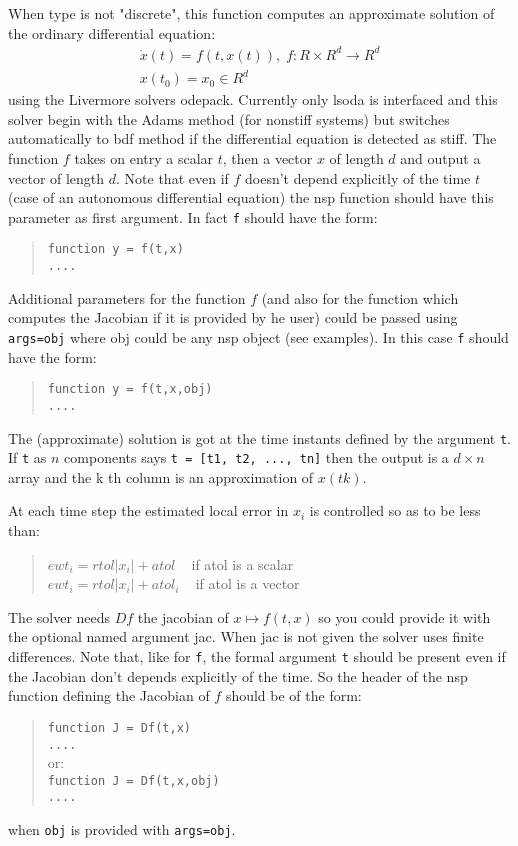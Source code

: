 \begin{mandescription}

When type is not "discrete", this function computes an approximate solution of the ordinary differential equation:
$$
\begin{array}{l}
   \dot{x}(t) = f(t, x(t)), \; f: R \times R^d \rightarrow  R^d \\
   x(t_0) = x_0  \in  R^d
\end{array}
$$
using the Livermore solvers odepack. Currently only lsoda is interfaced and this solver begin with the Adams
method (for nonstiff systems) but switches  automatically to bdf method if the differential equation is detected
as stiff. The function $f$ takes on entry a scalar $t$, then a vector $x$ of length $d$ and output a vector of 
length $d$. Note that even if $f$ doesn't depend explicitly of the time $t$ (case of an autonomous differential equation)
the nsp function should have this parameter as first argument. In fact \verb+f+ should have the
form:
\begin{quote}
{\tt function y = f(t,x) \\
      ....}
  \end{quote}

Additional parameters for the function $f$ (and also for the function which computes the Jacobian 
if it is provided by he user) could be passed using \verb+args=obj+ where obj could be any nsp 
object (see examples). In this case \verb+f+ should have the form:
\begin{quote}
{\tt function y = f(t,x,obj) \\
      ....}
\end{quote}

The (approximate) solution is got at the time instants defined by the argument \verb+t+.
If \verb+t+ as $n$ components says  \verb+t = [t1, t2, ..., tn]+ then the output is a
$d \times n$ array and the k th column is an approximation of $x(tk)$.

At each time step the estimated local error in $x_i$ is controlled so as to be less than:
\begin{quote}
   $ewt_i = rtol | x_i | + atol$ ~ if atol is a scalar \\
   $ewt_i = rtol | x_i | + atol_i$ ~ if atol is a vector
\end{quote}
 

The solver needs $Df$ the jacobian of $x \mapsto f(t,x)$ so you could provide it with the optional named argument 
jac. When jac is not given the solver uses finite differences. Note that, like for \verb+f+, the formal argument
\verb+t+ should be present even if the Jacobian don't depends explicitly of the time. So the header of the nsp 
function defining the Jacobian of $f$ should be of the form:
\begin{quote}
{\tt function J = Df(t,x) \\
      ....}\\
or:\\
{\tt function J = Df(t,x,obj) \\
     ....}
\end{quote}
when {\tt obj} is provided with {\tt args=obj}.




\end{mandescription}
